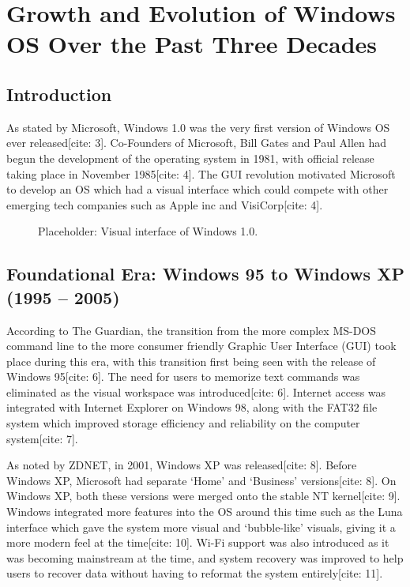 \documentclass[12pt]{report}
\begin{document}
\chapter{Growth and Evolution of Windows OS Over the Past Three Decades}
\label{chap1:ch:windows_evolution}

\section{Introduction}
\label{chap1:sec:introduction}
As stated by Microsoft, Windows 1.0 was the very first version of Windows OS ever released[cite: 3]. Co-Founders of Microsoft, Bill Gates and Paul Allen had begun the development of the operating system in 1981, with official release taking place in November 1985[cite: 4]. The GUI revolution motivated Microsoft to develop an OS which had a visual interface which could compete with other emerging tech companies such as Apple inc and VisiCorp[cite: 4].

\begin{figure}[htbp]
    \centering
    \caption{Placeholder: Visual interface of Windows 1.0.}
    \label{chap1:fig:windows_1_0}
\end{figure}

\section{Foundational Era: Windows 95 to Windows XP (1995 – 2005)}
\label{chap1:sec:foundational_era}
According to The Guardian, the transition from the more complex MS-DOS command line to the more consumer friendly Graphic User Interface (GUI) took place during this era, with this transition first being seen with the release of Windows 95[cite: 6]. The need for users to memorize text commands was eliminated as the visual workspace was introduced[cite: 6]. Internet access was integrated with Internet Explorer on Windows 98, along with the FAT32 file system which improved storage efficiency and reliability on the computer system[cite: 7].

As noted by ZDNET, in 2001, Windows XP was released[cite: 8]. Before Windows XP, Microsoft had separate ‘Home’ and ‘Business’ versions[cite: 8]. On Windows XP, both these versions were merged onto the stable NT kernel[cite: 9]. Windows integrated more features into the OS around this time such as the Luna interface which gave the system more visual and ‘bubble-like’ visuals, giving it a more modern feel at the time[cite: 10]. Wi-Fi support was also introduced as it was becoming mainstream at the time, and system recovery was improved to help users to recover data without having to reformat the system entirely[cite: 11].
\end{document}
